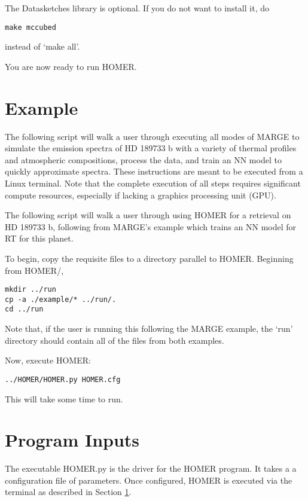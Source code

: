 \documentclass[letterpaper, 12pt]{article}
\begin{document}
\noindent The Datasketches library is optional.  If you do not want to install it, do 
\begin{verbatim}
make mccubed
\end{verbatim}
\noindent instead of `make all'.

\noindent You are now ready to run HOMER.


\section{Example}
\label{sec:example}

\noindent The following script will walk a user through executing all modes of MARGE 
to simulate the emission spectra of HD 189733 b with a variety of thermal 
profiles and atmospheric compositions, process the data, and train an NN 
model to quickly approximate spectra.  These instructions are meant to be 
executed from a Linux terminal.  Note that the complete execution of all steps 
requires significant compute resources, especially if lacking a graphics 
processing unit (GPU).

The following script will walk a user through using HOMER for a retrieval on 
HD 189733 b, following from MARGE's example which trains an NN model for RT 
for this planet.

\noindent To begin, copy the requisite files to a directory parallel to HOMER. 
Beginning from HOMER/, 
\begin{verbatim}
mkdir ../run
cp -a ./example/* ../run/.
cd ../run
\end{verbatim}
\noindent Note that, if the user is running this following the MARGE example, 
the `run' directory should contain all of the files from both examples.

\noindent Now, execute HOMER:

\begin{verbatim}
../HOMER/HOMER.py HOMER.cfg
\end{verbatim}

\noindent This will take some time to run. 


\section{Program Inputs}
\label{sec:inputs}

The executable HOMER.py is the driver for the HOMER program. It takes a 
a configuration file of parameters.  Once configured, HOMER is executed via 
the terminal as described in Section \ref{sec:example}.
\end{document}
